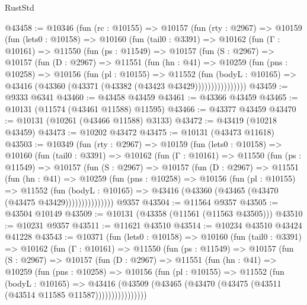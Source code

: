 \begin{lexlean}{RustStd}
\begin{coremodule}
@43458 := @10346
    (fun (rc : @10155) =>
    @10157
      (fun (rty : @2967) =>
      @10159
        (fun (lets0 : @10158) =>
        @10160
          (fun (tail0 : @3391) =>
          @10162
            (fun (Γ : @10161) =>
            @11550
              (fun (ps : @11549) =>
              @10157
                (fun (S : @2967) =>
                @10157
                  (fun (D : @2967) =>
                  @11551
                    (fun (hn : @41) =>
                    @10259
                      (fun (pns : @10258) =>
                      @10156
                        (fun (pl : @10155) =>
                        @11552
                          (fun (bodyL : @10165) =>
                          @43416 (@43360 (@43371 (@43382 (@43423 @43429))))))))))))))))
@43459 := @9333 @6341
@43460 := @43458 @43459
@43461 := @43366 @43459
@43465 := @10131 (@11574 (@43461 @11588) @11595)
@43466 := @43377 @43459
@43470 := @10131 (@10261 (@43466 @11588) @3133)
@43472 := @43419 (@10218 @43459)
@43473 := @10202 @43472
@43475 := @10131 (@43473 @11618)
@43503 := @10349
    (fun (rty : @2967) =>
    @10159
      (fun (lets0 : @10158) =>
      @10160
        (fun (tail0 : @3391) =>
        @10162
          (fun (Γ : @10161) =>
          @11550
            (fun (ps : @11549) =>
            @10157
              (fun (S : @2967) =>
              @10157
                (fun (D : @2967) =>
                @11551
                  (fun (hn : @41) =>
                  @10259
                    (fun (pns : @10258) =>
                    @10156
                      (fun (pl : @10155) =>
                      @11552
                        (fun (bodyL : @10165) =>
                        @43416 (@43360 (@43465 (@43470 (@43475 @43429)))))))))))))))
    @9357
@43504 := @11564 @9357
@43505 := @43504 @10149
@43509 := @10131 (@43358 (@11561 (@11563 @43505)))
@43510 := @10231 @9357
@43511 := @11621 @43510
@43514 := @10234 @43510 @43424 @41228
@43543 := @10371
    (fun (lets0 : @10158) =>
    @10160
      (fun (tail0 : @3391) =>
      @10162
        (fun (Γ : @10161) =>
        @11550
          (fun (ps : @11549) =>
          @10157
            (fun (S : @2967) =>
            @10157
              (fun (D : @2967) =>
              @11551
                (fun (hn : @41) =>
                @10259
                  (fun (pns : @10258) =>
                  @10156
                    (fun (pl : @10155) =>
                    @11552
                      (fun (bodyL : @10165) =>
                      @43416
                        (@43509
                          (@43465 (@43470 (@43475 (@43511 (@43514 @11585 @11587))))))))))))))))

\end{coremodule}
\end{lexlean}
